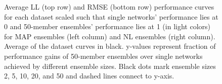 \documentclass[../thesis.tex]{subfiles}
\begin{document}
\begin{figure}
    \centering
    \begin{subfigure}{0.49\textwidth}
        \setlength{\figwidth}{.99\textwidth}
        \setlength{\figheight}{.33\textheight}
        
    \end{subfigure}
    \begin{subfigure}{0.49\textwidth}
        \setlength{\figwidth}{.99\textwidth}
        \setlength{\figheight}{.33\textheight}
        
    \end{subfigure}

    \begin{subfigure}{0.49\textwidth}
        \setlength{\figwidth}{.99\textwidth}
        \setlength{\figheight}{.33\textheight}
        
    \end{subfigure}
    \begin{subfigure}{0.49\textwidth}
        \setlength{\figwidth}{.99\textwidth}
        \setlength{\figheight}{.33\textheight}
        
    \end{subfigure}
    \caption{Average LL (top row) and RMSE (bottom row) performance curves for each dataset scaled such that single networks' performance lies at 0 and 50-member ensembles' performance lies at 1 (in light colors) for MAP ensembles (left column) and NL ensembles (right column). Average of the dataset curves in black. y-values represent fraction of performance gains of 50-member ensembles over single networks achieved by different ensemble sizes. Black dots mark ensemble sizes 2, 5, 10, 20, and 50 and dashed lines connect to y-axis.}
    \label{fig:uci-ensemble-sizes-ohl}
\end{figure}
\end{document}
